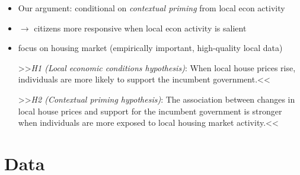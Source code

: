 \documentclass[10pt,aspectratio=169,handout]{beamer}
\begin{document}
\begin{frame}
\begin{itemize}[<+->]
	\item Our argument: conditional on \textit{contextual priming} from local econ activity	
	\item $\rightarrow$ citizens more responsive when local econ activity is salient
	\item focus on housing market (empirically important, high-quality local data)
	\begin{exampleblock}{}
		>>\textit{H1 (Local economic conditions hypothesis)}: When local house prices rise, individuals are more likely to support the incumbent government.<<
	\end{exampleblock}
	\begin{exampleblock}{}
		>>\textit{H2 (Contextual priming hypothesis)}: The association between changes in local house prices and support for the incumbent government is stronger when individuals are more exposed to local housing market activity.<<
	\end{exampleblock}

\end{itemize}

\end{frame}

\section{Data}
\end{document}
